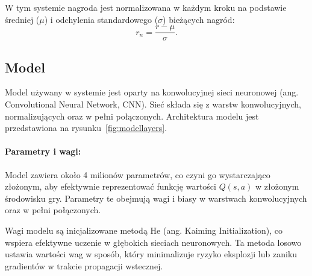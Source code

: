W tym systemie nagroda jest normalizowana w każdym kroku na podstawie średniej (\(\mu\)) i odchylenia standardowego (\(\sigma\)) bieżących nagród:
\[
	r_n = \frac{r - \mu}{\sigma}.
\]
\subsection{Model}

Model używany w systemie jest oparty na konwolucyjnej sieci neuronowej (ang. Convolutional Neural Network, CNN). Sieć składa się z warstw konwolucyjnych, normalizujących oraz w pełni połączonych. Architektura modelu jest przedstawiona na rysunku~\ref{fig:modellayers}.

\paragraph{Parametry i wagi:}
Model zawiera około 4 milionów parametrów, co czyni go wystarczająco złożonym, aby efektywnie reprezentować funkcję wartości \(Q(s, a)\) w złożonym środowisku gry. Parametry te obejmują wagi i biasy w warstwach konwolucyjnych oraz w pełni połączonych.

Wagi modelu są inicjalizowane metodą He\cite{he2015} (ang. Kaiming Initialization), co wspiera efektywne uczenie w głębokich sieciach neuronowych. Ta metoda losowo ustawia wartości wag w sposób, który minimalizuje ryzyko eksplozji lub zaniku gradientów w trakcie propagacji wstecznej.

